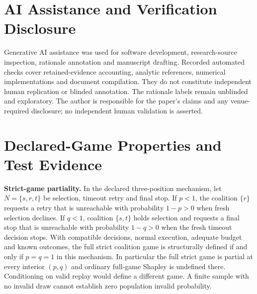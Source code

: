 \documentclass[conference]{IEEEtran}
\begin{document}
\section*{AI Assistance and Verification Disclosure}
Generative AI assistance was used for software development, research-source
inspection, rationale annotation and manuscript drafting. Recorded automated
checks cover retained-evidence accounting, analytic references, numerical
implementations and document compilation. They do not constitute independent
human replication or blinded annotation. The rationale labels remain unblinded
and exploratory. The author is responsible for the paper's claims and any
venue-required disclosure; no independent human validation is asserted.

\appendices
\section{Declared-Game Properties and Test Evidence}
\label{app:games}
\textbf{Strict-game partiality.} In the declared three-position mechanism,
let $N=\{s,r,t\}$ be selection, timeout retry and final stop. If $p<1$, the
coalition $\{r\}$ requests a retry that is unreachable with probability
$1-p>0$ when fresh selection declines. If $q<1$, coalition
$\{s,t\}$ holds selection and requests a final stop that is unreachable with
probability $1-q>0$ when the fresh timeout decision stops. With compatible
decisions, normal execution, adequate budget and known outcomes, the full strict
coalition game is structurally defined if and only if $p=q=1$ in this mechanism.
In particular the full strict game is partial at every interior $(p,q)$ and
ordinary full-game Shapley is undefined there. Conditioning on valid replay
would define a different game. A finite sample with no invalid draw cannot
establish zero population invalid probability.
\end{document}
